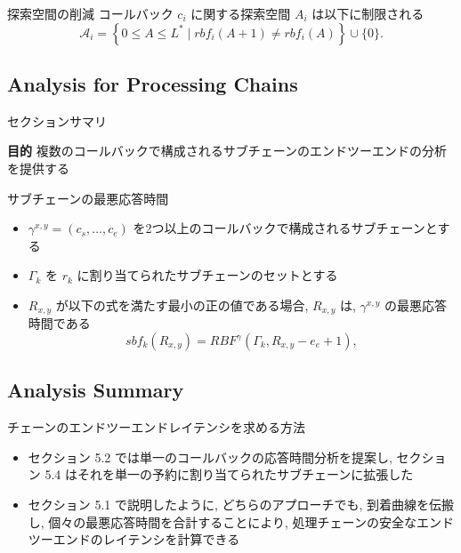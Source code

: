 \begin{frame}{探索空間の削減}
    コールバック $c_i$ に関する探索空間 $A_i$ は以下に制限される
    \begin{equation*}
        \mathcal{A}_{i}=\left\{0 \leq A \leq L^{*} \mid r b f_{i}(A+1) \neq r b f_{i}(A)\right\} \cup\{0\} .
    \end{equation*}
\end{frame}


\subsection{Analysis for Processing Chains}
\label{ssec: analysis for processing chains}

\begin{frame}{セクションサマリ}
    \begin{itembox}[l]{\textbf{目的}}
        複数のコールバックで構成されるサブチェーンのエンドツーエンドの分析を提供する
    \end{itembox}
\end{frame}

\begin{frame}[label=lemma8]{サブチェーンの最悪応答時間}
    \begin{lemma}[サブチェーンの最悪応答時間]
        \begin{itemize}
            \item $\gamma^{x, y}=\left(c_{s}, \ldots, c_{e}\right)$ を2つ以上のコールバックで構成されるサブチェーンとする
            \item $\Gamma_{k}$ を $r_{k}$ に割り当てられたサブチェーンのセットとする
            \item $R_{x, y}$ が以下の式を満たす最小の正の値である場合, $R_{x, y}$ は, $\gamma^{x, y}$ の最悪応答時間である
                  \begin{equation*}
                      s b f_{k}\left(R_{x, y}\right)=R B F^{\gamma}\left(\Gamma_{k}, R_{x, y}-e_{e}+1\right),
                  \end{equation*}
        \end{itemize}
    \end{lemma}
\end{frame}


\subsection{Analysis Summary}
\label{ssec: analysis summary}

\begin{frame}{チェーンのエンドツーエンドレイテンシを求める方法}
    \begin{itemize}
        \item セクション 5.2 では単一のコールバックの応答時間分析を提案し, セクション 5.4 はそれを単一の予約に割り当てられたサブチェーンに拡張した
        \item セクション 5.1 で説明したように, どちらのアプローチでも, 到着曲線を伝搬し, 個々の最悪応答時間を合計することにより, 処理チェーンの安全なエンドツーエンドのレイテンシを計算できる
    \end{itemize}
\end{frame}
